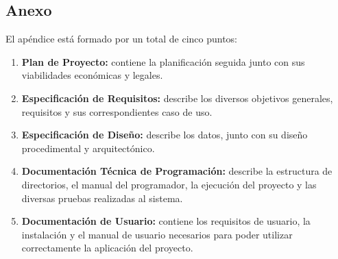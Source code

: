 \subsection{Anexo}
El apéndice está formado por un total de cinco puntos:
\begin{enumerate}
    \item \textbf{Plan de Proyecto:} contiene la planificación seguida junto con sus viabilidades económicas y legales.
    \item \textbf{Especificación de Requisitos:} describe los diversos objetivos generales, requisitos y sus correspondientes caso de uso.
    \item \textbf{Especificación de Diseño:} describe los datos, junto con su diseño procedimental y arquitectónico.
    \item \textbf{Documentación Técnica de Programación:} describe la estructura de directorios, el manual del programador, la ejecución del proyecto y las diversas pruebas realizadas al sistema.
    \item \textbf{Documentación de Usuario:} contiene los requisitos de usuario, la instalación y el manual de usuario necesarios para poder utilizar correctamente la aplicación del proyecto.
\end{enumerate}


